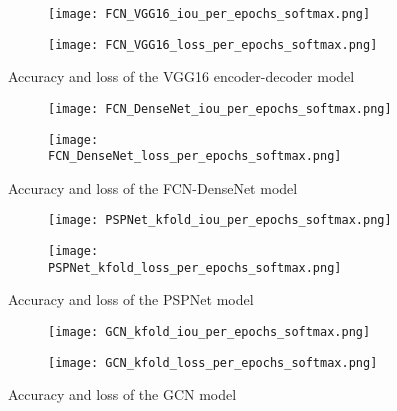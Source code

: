 \begin{figure}[!h]
	\centering
	\begin{subfigure}[b]{0.47\textwidth}
		\centering
		\texttt{[image: FCN\_VGG16\_iou\_per\_epochs\_softmax.png]}
		\caption{}
		\label{fig:vgg16_accuracy_metric}
	\end{subfigure}		
	\hfill
	\begin{subfigure}[b]{0.47\textwidth}
		\centering
		\texttt{[image: FCN\_VGG16\_loss\_per\_epochs\_softmax.png]}
		\caption{}
		\label{fig:vgg16_loss_metric}
	\end{subfigure}
	\caption{Accuracy and loss of the VGG16 encoder-decoder model}
	\label{fig:Vgg16_iou_loss}
\end{figure}
\begin{figure}[!h]
	\begin{subfigure}[b]{0.47\textwidth}
	\centering
	\texttt{[image: FCN\_DenseNet\_iou\_per\_epochs\_softmax.png]}
	\caption{}
	\label{fig:fcn_densenet_accuracy_metric}
	\end{subfigure}
	\hfill
	\begin{subfigure}[b]{0.47\textwidth}
	\centering
	\texttt{[image: FCN\_DenseNet\_loss\_per\_epochs\_softmax.png]}
	\caption{}
	\label{fig:fcn_densenet_loss_metric}
	\end{subfigure}	
\caption{Accuracy and loss of the FCN-DenseNet model}
\label{fig:FCN_DenseNet_iou_loss}
\end{figure}
\begin{figure} [!h]
	\centering
	\begin{subfigure}[b]{0.47\textwidth}
		\centering
		\texttt{[image: PSPNet\_kfold\_iou\_per\_epochs\_softmax.png]}
		\caption{}
		\label{fig:psp_accuracy_metric}
	\end{subfigure}
	\hfill
	\begin{subfigure}[b]{0.47\textwidth}
		\centering
		\texttt{[image: PSPNet\_kfold\_loss\_per\_epochs\_softmax.png]}
	\caption{}
	\label{fig:psp_loss_metric}
	\end{subfigure}
	\caption{Accuracy and loss of the PSPNet model}
	\label{fig:PSPNet_iou_loss}
\end{figure}
\begin{figure} [!h]
	\centering
	\begin{subfigure}[b]{0.47\textwidth}
		\centering
		\texttt{[image: GCN\_kfold\_iou\_per\_epochs\_softmax.png]}
		\caption{}
		\label{fig:gcn_accuracy_metric}
	\end{subfigure}
	\hfill
	\begin{subfigure}[b]{0.47\textwidth}
		\centering
		\texttt{[image: GCN\_kfold\_loss\_per\_epochs\_softmax.png]}			
		\caption{}
		\label{fig:gcn_loss_metric}
	\end{subfigure}
	\caption{Accuracy and loss of the GCN model}
	\label{fig:GCN_iou_loss}	
\end{figure}
